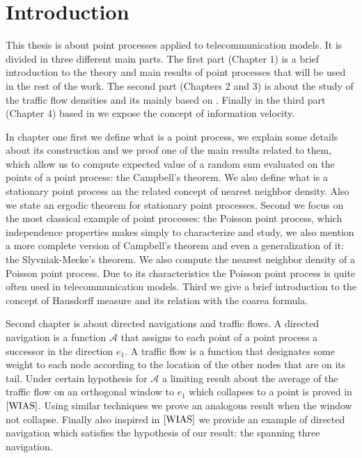 \chapter*{Introduction}

This thesis is about point processes applied to telecommunication models. It is divided in three different main parts. The first part (Chapter 1) is a brief introduction to the theory and main results of point processes that will be used in the rest of the work. The second part (Chapters 2 and 3) is about the study of the traffic flow densities and its mainly based on \cite{WIAS}. Finally in the third part (Chapter 4) based in \cite{Iye} we expose the concept of information velocity.

In chapter one first we define what is a point process, we explain some details about its construction and we proof one of the main results related to them, which allow us to compute expected value of a random sum evaluated on the points of a point process: the Campbell's theorem. We also define what is a stationary point process an the related concept of nearest neighbor density.  Also we state an ergodic theorem for stationary point processes. Second we focus on the most classical example of point processes: the Poisson point process, which independence properties makes simply to characterize and study, we also mention a more complete version of Campbell's theorem and even a generalization of it: the Slyvniak-Mecke's theorem. We also compute the nearest neighbor density of a Poisson point process. Due to its characteristics the Poisson point process is quite often used in telecommunication models. Third we give a brief introduction to the concept of Hausdorff measure and its relation with the coarea formula.

Second chapter is about directed navigations and traffic flows. A directed navigation is a function $\mathcal{A}$ that assigns to each point of a point process a successor in the direction $e_1$. A traffic flow is a function that designates some weight to each node according to the location of the other nodes that are on its tail. Under certain hypothesis for $\mathcal{A}$ a limiting result about the average of the traffic flow on an orthogonal window to $e_1$ which collapses to a point is proved in $\cite{WIAS}$. Using similar techniques we prove an analogous result when the window not collapse. Finally also inspired in $\cite{WIAS}$ we provide an example of directed navigation which satisfies the hypothesis of our result: the spanning three navigation. 

